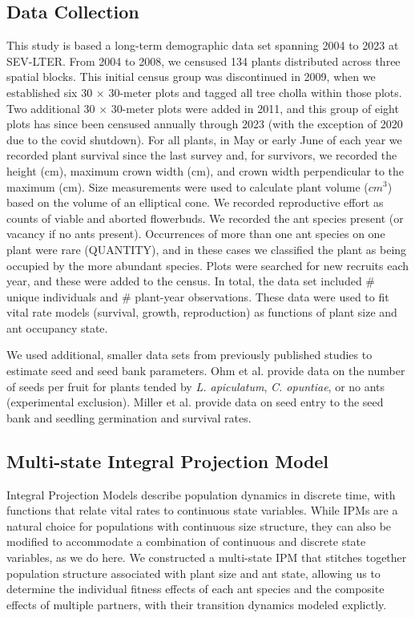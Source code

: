\documentclass[11pt]{article}
\begin{document}
\subsection*{Data Collection}
This study is based a long-term demographic data set spanning 2004 to 2023 at SEV-LTER. 
From 2004 to 2008, we censused 134 plants distributed across three spatial blocks. 
This initial census group was discontinued in 2009, when we established six 30 $\times$ 30-meter plots and tagged all tree cholla within those plots. 
Two additional 30 $\times$ 30-meter plots were added in 2011, and this group of eight plots has since been censused annually through 2023 (with the exception of 2020 due to the covid shutdown). 
For all plants, in May or early June of each year we recorded plant survival since the last survey and, for survivors, we recorded the height (cm), maximum crown width (cm), and crown width perpendicular to the maximum (cm).
Size measurements were used to calculate plant volume ($cm^3$) based on the volume of an elliptical cone. 
We recorded reproductive effort as counts of viable and aborted flowerbuds. 
We recorded the ant species present (or vacancy if no ants present).
Occurrences of more than one ant species on one plant were rare (QUANTITY), and in these cases we classified the plant as being occupied by the more abundant species. 
Plots were searched for new recruits each year, and these were added to the census.
In total, the data set included \# unique individuals and \# plant-year observations. 
These data were used to fit vital rate models (survival, growth, reproduction) as functions of plant size and ant occupancy state. 

We used additional, smaller data sets from previously published studies to estimate seed and seed bank parameters. 
Ohm et al. \citep{Ohm2014} provide data on the number of seeds per fruit for plants tended by \textit{L. apiculatum}, \textit{C. opuntiae}, or no ants (experimental exclusion). 
Miller et al. \citep{Miller2009} provide data on seed entry to the seed bank and seedling germination and survival rates. 


\subsection*{Multi-state Integral Projection Model}
Integral Projection Models describe population dynamics in discrete time, with functions that relate vital rates to continuous state variables. 
While IPMs are a natural choice for populations with continuous size structure, they can also be modified to accommodate a combination of continuous and discrete state variables, as we do here. 
We constructed a multi-state IPM that stitches together population structure associated with plant size and ant state, allowing us to determine the individual fitness effects of each ant species and the composite effects of multiple partners, with their transition dynamics modeled explictly. 
\end{document}
